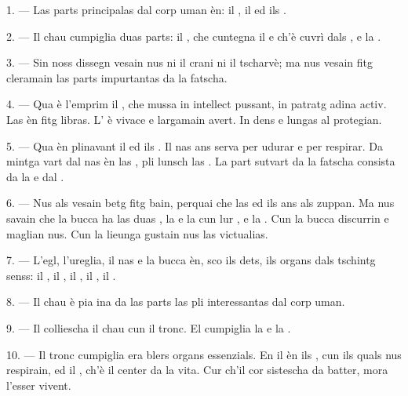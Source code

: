 \VUsaut{3.0mm}

1. --- Las parts principalas dal corp uman èn: il , il 
ed ils .

2. --- Il chau cumpiglia duas parts: il , che cuntegna il
 e ch'è cuvrì dals , e la .

3. --- Sin noss dissegn vesain nus ni il crani ni il tscharvè; ma nus vesain fitg
cleramain las parts impurtantas da la fatscha.

4. --- Qua è l'emprim il , che mussa in intellect pussant, in
patratg adina activ. Las  èn fitg libras. L' è vivace e
largamain avert. In dens  e lungas  al protegian.

5. --- Qua èn plinavant il  ed ils . Il nas ans serva
per udurar e per respirar. Da mintga vart dal nas èn las , pli
lunsch las . La part sutvart da la fatscha consista da la
 e dal .

6. --- Nus als vesain betg fitg bain, perquai che las  ed ils
 ans als zuppan. Ma nus savain che la bucca ha las duas
, la  e la  cun lur
, e la . Cun la bucca discurrin e maglian nus. Cun la
lieunga gustain nus las victualias.

7. --- L'egl, l'ureglia, il nas e la bucca èn, sco ils dets, ils organs dals
tschintg senss: il , il , il
, il , il .

8. --- Il chau è pia ina da las parts las pli interessantas dal corp uman.

\VUsaut{4.4mm}
\VUsaut{3.0mm}

9. --- Il  colliescha il chau cun il tronc. El cumpiglia la
 e la .

10. --- Il tronc cumpiglia era blers organs essenzials. En il  èn ils
, cun ils quals nus respirain, ed il , ch'è il center
da la vita. Cur ch'il cor sistescha da batter, mora l'esser vivent.

